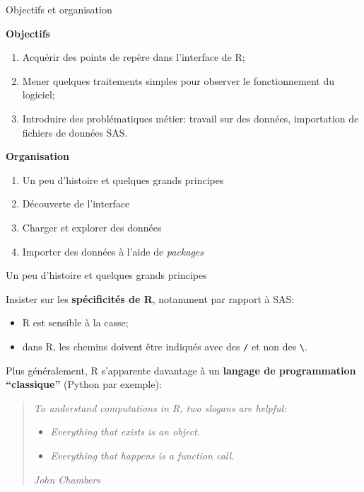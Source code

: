 \documentclass[12pt,ignorenonframetext,]{beamer}
\providecommand{\tightlist}{%
  \setlength{\itemsep}{0pt}\setlength{\parskip}{0pt}}
\newcommand{\strong}[1]{\textbf{\textcolor{redInsee}{#1}}}
\begin{document}
\begin{frame}{Objectifs et organisation}

\strong{Objectifs}

\begin{enumerate}
\def\labelenumi{\arabic{enumi}.}
\tightlist
\item
  Acquérir des points de repère dans l'interface de R;
\item
  Mener quelques traitements simples pour observer le fonctionnement du
  logiciel;
\item
  Introduire des problématiques métier: travail sur des données,
  importation de fichiers de données SAS.
\end{enumerate}

\bigskip \pause \strong{Organisation}

\begin{enumerate}
\def\labelenumi{\arabic{enumi}.}
\item
  Un peu d'histoire et quelques grands principes
\item
  Découverte de l'interface
\item
  Charger et explorer des données
\item
  Importer des données à l'aide de \emph{packages}
\end{enumerate}

\end{frame}

\begin{frame}[fragile]{\large Un peu d'histoire et quelques grands
principes}

Insister sur les \textbf{spécificités de R}, notamment par rapport à
SAS:

\begin{itemize}
\tightlist
\item
  R est sensible à la casse;
\item
  dans R, les chemins doivent être indiqués avec des \texttt{/} et non
  des \texttt{\textbackslash{}}.
\end{itemize}

\bigskip \pause Plus généralement, R s'apparente davantage à un
\textbf{langage de programmation \enquote{classique}} (Python par
exemple):

\begin{quote}
\emph{To understand computations in R, two slogans are helpful:}

\begin{itemize}
\item
  \emph{Everything that exists is an object.}
\item
  \emph{Everything that happens is a function call.}
\end{itemize}

\emph{John Chambers}
\end{quote}

\end{frame}
\end{document}
